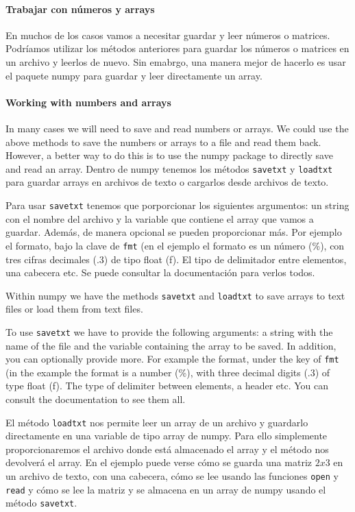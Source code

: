\begin{paracol}{2}
\paragraph*{Trabajar con números y arrays}
 En muchos de los casos vamos a necesitar guardar y leer números o matrices. Podríamos utilizar los métodos anteriores para guardar los números o matrices en un archivo y leerlos de nuevo. Sin emabrgo, una manera mejor de hacerlo es usar el paquete numpy para guardar y leer directamente un array.
 \switchcolumn
 \paragraph*{Working with numbers and arrays}
 In many cases we will need to save and read numbers or arrays. We could use the above methods to save the numbers or arrays to a file and read them back. However, a better way to do this is to use the numpy package to directly save and read an array.
 \switchcolumn
 Dentro de numpy tenemos los métodos \texttt{savetxt} y \texttt{loadtxt} para guardar arrays en archivos de texto o cargarlos desde archivos de texto. 

 Para usar \texttt{savetxt} tenemos que porporcionar los siguientes argumentos: un string con el nombre del archivo y la variable que contiene el array que vamos a guardar. Además, de manera opcional se pueden proporcionar más. Por ejemplo el formato, bajo la clave de \texttt{fmt} (en el ejemplo el formato es un número (\%), con tres cifras decimales ($.3$) de tipo float (f). El tipo de delimitador entre elementos, una cabecera etc. Se puede consultar la documentación para verlos todos.
 
 \switchcolumn

 Within numpy we have the methods \texttt{savetxt} and \texttt{loadtxt} to save arrays to text files or load them from text files. 

 To use \texttt{savetxt} we have to provide the following arguments: a string with the name of the file and the variable containing the array to be saved. In addition, you can optionally provide more. For example the format, under the key of \texttt{fmt} (in the example the format is a number (\%), with three decimal digits ($.3$) of type float (f). The type of delimiter between elements, a header etc. You can consult the documentation to see them all.

 \switchcolumn
 El método \texttt{loadtxt} nos permite leer un array de un archivo y guardarlo directamente en una variable de tipo array de numpy. Para ello simplemente proporcionaremos el archivo donde está almacenado el array y el método nos devolverá el array. En el ejemplo puede verse cómo se guarda una matriz $2x3$ en un archivo de texto, con una cabecera, cómo se lee usando las funciones \texttt{open} y \texttt{read} y cómo se lee la matriz y se almacena en un array de numpy usando el método \texttt{savetxt}.


\end{paracol}
